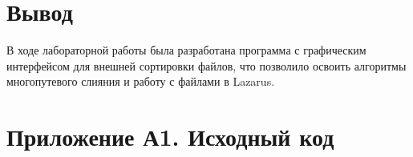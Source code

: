 \documentclass[oneside,a4paper,14pt]{extarticle}
\begin{document}
\section*{Вывод}

В ходе лабораторной работы была разработана программа с графическим интерфейсом для внешней сортировки файлов, что позволило освоить алгоритмы многопутевого слияния и работу с файлами в Lazarus.

\newpage


\section*{Приложение А1. Исходный код}
\inputminted{pas}{code/lab8_unit.pas}
\end{document}
